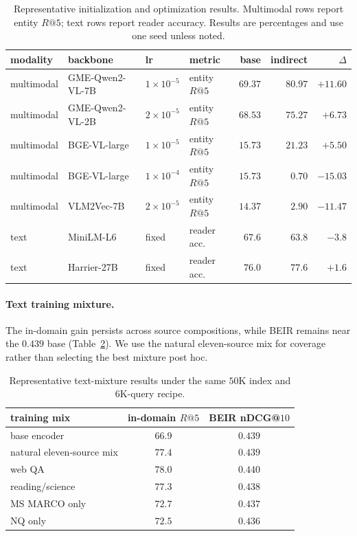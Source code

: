 \begin{table}[H]
\centering\scriptsize
\setlength{\tabcolsep}{3.6pt}
\caption{Representative initialization and optimization results. Multimodal rows report entity
$R@5$; text rows report reader accuracy. Results are percentages and use one seed unless noted.}
\label{tab:ab_init}
\begin{tabular}{llllrrr}
\toprule
modality & backbone & lr & metric & base & indirect & $\Delta$ \\
\midrule
multimodal & GME-Qwen2-VL-7B & $1\!\times\!10^{-5}$ & entity $R@5$ & $69.37$ & $80.97$ & $+11.60$ \\
multimodal & GME-Qwen2-VL-2B & $2\!\times\!10^{-5}$ & entity $R@5$ & $68.53$ & $75.27$ & $+6.73$ \\
multimodal & BGE-VL-large & $1\!\times\!10^{-5}$ & entity $R@5$ & $15.73$ & $21.23$ & $+5.50$ \\
multimodal & BGE-VL-large & $1\!\times\!10^{-4}$ & entity $R@5$ & $15.73$ & $0.70$ & $-15.03$ \\
multimodal & VLM2Vec-7B & $2\!\times\!10^{-5}$ & entity $R@5$ & $14.37$ & $2.90$ & $-11.47$ \\
text & MiniLM-L6 & fixed & reader acc. & $67.6$ & $63.8$ & $-3.8$ \\
text & Harrier-27B & fixed & reader acc. & $76.0$ & $77.6$ & $+1.6$ \\
\bottomrule
\end{tabular}
\end{table}

\paragraph{Text training mixture.} The in-domain gain persists across source compositions, while
BEIR remains near the $0.439$ base (Table~\ref{tab:ab_datamix}). We use the natural eleven-source
mix for coverage rather than selecting the best mixture post hoc.

\begin{table}[H]
\centering\scriptsize
\setlength{\tabcolsep}{8pt}
\caption{Representative text-mixture results under the same $50$K index and $6$K-query recipe.}
\label{tab:ab_datamix}
\begin{tabular}{lcc}
\toprule
training mix & in-domain $R@5$ & BEIR nDCG@$10$ \\
\midrule
base encoder & $66.9$ & $0.439$ \\
natural eleven-source mix & $77.4$ & $0.439$ \\
web QA & $78.0$ & $0.440$ \\
reading/science & $77.3$ & $0.438$ \\
MS MARCO only & $72.7$ & $0.437$ \\
NQ only & $72.5$ & $0.436$ \\
\bottomrule
\end{tabular}
\end{table}


